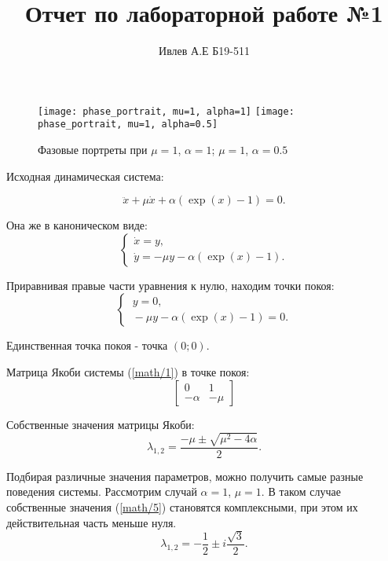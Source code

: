 \documentclass[10pt,a4paper]{article}
\title{Отчет по лабораторной работе №1}
\author{Ивлев А.Е Б19-511}
\begin{document}
	\maketitle
	
	\begin{figure}[h]
		\centering
		{\texttt{[image: phase\_portrait, mu=1, alpha=1]}}
		{\texttt{[image: phase\_portrait, mu=1, alpha=0.5]}}
		\caption{Фазовые портреты при $\mu = 1$, $\alpha = 1$; $\mu = 1$, $\alpha = 0.5$}
		\label{image/1}
	\end{figure}

	Исходная динамическая система:
	
	\begin{equation}
		\label{math/1}
		\ddot{x} + \mu \dot{x} + \alpha (\exp(x) - 1) = 0.	
	\end{equation}
	
	Она же в каноническом виде:
	\begin{equation}
		\label{math/2}
		\begin{cases}
			\dot{x} = y, \\
			\dot{y} = -\mu y - \alpha (\exp(x) - 1).
		\end{cases}
	\end{equation}

	Приравнивая правые части уравнения к нулю, находим точки покоя:
	\begin{equation}
		\label{math/3}
		\begin{cases}
			\ y = 0, \\
			\ -\mu y - \alpha (\exp(x) - 1) = 0.
		\end{cases}
	\end{equation}
	
	Единственная точка покоя - точка $(0;0)$.
	
	Матрица Якоби системы (\ref{math/1}) в точке покоя:
	\begin{equation}
		\label{math/4}
		\begin{bmatrix}
			0& 1\\
			-\alpha& -\mu
		\end{bmatrix}
	\end{equation}
	
	Собственные значения матрицы Якоби:
	\begin{equation}
		\label{math/5}
		\lambda_{1,2} = \frac{-\mu \pm \sqrt{\mu^{2} - 4\alpha}}{2}.
	\end{equation}
	
	Подбирая различные значения параметров, можно получить самые разные поведения системы. Рассмотрим случай $\alpha = 1$, $\mu = 1$. В таком случае собственные значения (\ref{math/5}) становятся комплексными, при этом их действительная часть меньше нуля.
	\begin{equation}
		\label{math/6}
		\lambda_{1,2} = -\frac{1}{2} \pm i \frac{\sqrt{3}}{2}.
	\end{equation}
	
\end{document}
